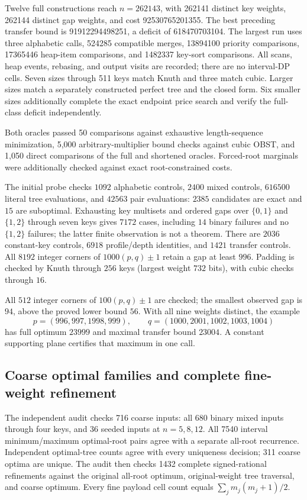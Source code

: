 \documentclass[11pt]{article}
\begin{document}
Twelve full constructions reach $n=262143$, with 262141 distinct key weights,
262144 distinct gap weights, and cost 92530765201355. The best preceding
transfer bound is 91912294498251, a deficit of 618470703104. The largest run
uses three alphabetic calls, 524285 compatible merges, 13894100 priority
comparisons, 17365446 heap-item comparisons, and 1482337 key-sort comparisons.
All scans, heap events, rebasing, and output visits are recorded; there are
no interval-DP cells. Seven sizes through 511 keys match Knuth and three
match cubic. Larger sizes match a separately constructed perfect tree and
the closed form. Six smaller sizes additionally complete the exact endpoint
price search and verify the full-class deficit independently.

Both oracles passed 50 comparisons against exhaustive length-sequence
minimization, 5,000 arbitrary-multiplier bound checks against cubic OBST,
and 1,050 direct comparisons of the full and shortened oracles.
Forced-root marginals were additionally checked against exact
root-constrained costs.

The initial probe checks $1092$ alphabetic controls, $2400$ mixed controls,
$616500$ literal tree evaluations, and $42563$ pair evaluations: $2385$
candidates are exact and $15$ are suboptimal. Exhausting key multisets
and ordered gaps over $\{0,1\}$ and $\{1,2\}$ through seven keys gives
$7172$ cases, including $14$ binary failures and no $\{1,2\}$ failures;
the latter finite observation is not a theorem. There are $2036$
constant-key controls, $6918$ profile/depth identities, and $1421$
transfer controls. All $8192$ integer corners of $1000(p,q)\pm1$ retain
a gap at least $996$. Padding is checked by Knuth through $256$ keys
(largest weight $732$ bits), with cubic checks through $16$.

All $512$ integer corners of
$100(p,q)\pm1$ are checked; the smallest observed gap is $94$, above
the proved lower bound $56$. With all nine weights distinct, the example
\[
 p=(996,997,1998,999),\qquad q=(1000,2001,1002,1003,1004)
\]
has full optimum $23999$ and maximal transfer bound $23004$. A constant
supporting plane certifies that maximum in one call.

\subsection{Coarse optimal families and complete fine-weight refinement}
\label{app:coarse-face}
The independent audit checks 716 coarse inputs: all 680 binary mixed
inputs through four keys, and 36 seeded inputs at $n=5,8,12$.
All 7540 interval minimum/maximum optimal-root pairs agree with a separate
all-root recurrence. Independent optimal-tree counts agree with every
uniqueness decision; 311 coarse optima are unique. The audit then checks
1432 complete signed-rational refinements against the original all-root
optimum, original-weight tree traversal, and coarse optimum. Every fine
payload cell count equals $\sum_jm_j(m_j+1)/2$.
\end{document}
